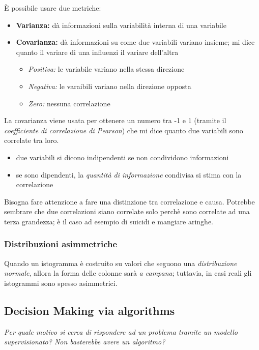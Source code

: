 \documentclass{report}
\begin{document}
\noindent È possibile usare due metriche:
\begin{itemize}
    \item \textbf{Varianza:} dà informazioni sulla variabilità interna di una variabile 
    \item \textbf{Covarianza:} dà informazioni su come due variabili variano insieme; mi dice quanto il variare di una 
    influenzi il variare dell'altra
    \begin{itemize}
        \item \textit{Positiva:} le variabile variano nella stessa direzione 
        \item \textit{Negativa:} le varaibili variano nella direzione opposta
        \item \textit{Zero:} nessuna correlazione
    \end{itemize}
\end{itemize}

\noindent La covarianza viene usata per ottenere un numero tra -1 e 1 (tramite il \textit{coefficiente di correlazione di Pearson}) che mi dice quanto due variabili sono correlate tra loro.

\begin{itemize}
    \item due variabili si dicono indipendenti se non condividono informazioni 
    \item se sono dipendenti, la \textit{quantità di informazione} condivisa si stima con la correlazione
\end{itemize}

\noindent Bisogna fare attenzione a fare una distinzione tra correlazione e causa. Potrebbe sembrare che due correlazioni siano 
correlate solo perchè sono correlate ad una terza grandezza; è il caso ad esempio di suicidi e mangiare aringhe.

\subsubsection{Distribuzioni asimmetriche}
Quando un istogramma è costruito su valori che seguono una \textit{distribuzione normale}, allora la forma delle colonne sarà \textit{a campana}; 
tuttavia, in casi reali gli istogrammi sono spesso asimmetrici.

\subsection{Decision Making via algorithms}
\textit{Per quale motivo si cerca di rispondere ad un problema tramite un modello supervisionato? 
Non basterebbe avere un algoritmo?}
\end{document}
